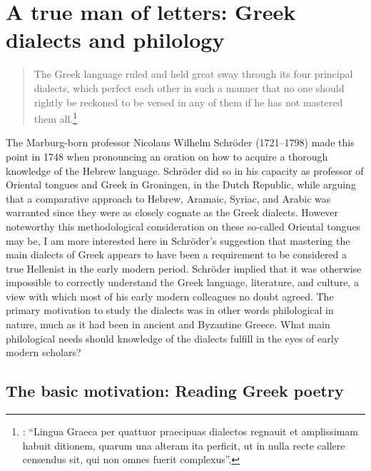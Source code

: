 \chapter{A true man of letters: Greek dialects and philology}\label{chap:3}
\begin{quote}
The Greek language ruled and held great sway through its four principal dialects, which perfect each other in such a manner that no one should rightly be reckoned to be versed in any of them if he has not mastered them all.\footnote{\citet[53-54]{Schroeder1748}: “Lingua Graeca per quattuor praecipuas dialectos regnauit et amplissimam habuit ditionem, quarum una alteram ita perficit, ut in nulla recte callere censendus sit, qui non omnes fuerit complexus”.}
\end{quote}

The Marburg-born professor Nicolaus Wilhelm Schröder (1721–1798) made this point in 1748 when pronouncing an oration on how to acquire a thorough knowledge of the Hebrew language. Schröder did so in his capacity as professor of Oriental tongues and Greek in Groningen, in the Dutch Republic, while arguing that a comparative approach to Hebrew, Aramaic, Syriac, and Arabic was warranted since they were as closely cognate as the Greek dialects. However noteworthy this methodological consideration on these so-called Oriental tongues may be, I am more interested here in Schröder’s suggestion that mastering the main dialects of Greek appears to have been a requirement to be considered a true Hellenist in the early modern period. Schröder implied that it was otherwise impossible to correctly understand the Greek language, literature, and culture, a view with which most of his early modern colleagues no doubt agreed. The primary motivation to study the dialects was in other words philological in nature, much as it had been in ancient and Byzantine Greece. What main philological needs should knowledge of the dialects fulfill in the eyes of early modern scholars?

\section{The basic motivation: Reading Greek poetry}\label{sec:3.1}

